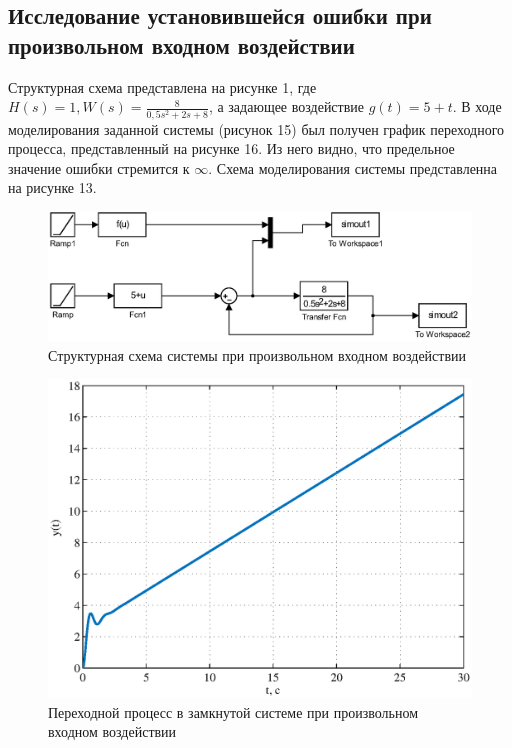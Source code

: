 \documentclass[a4paper,12pt]{article} %
\begin{document}
\newpage
\begin{center}
\section{Исследование установившейся ошибки при произвольном входном воздействии}
\end{center}\par
 Структурная схема представлена на рисунке 1, где $H(s) = 1, W(s) = \displaystyle{\frac{8}{0,5s^2 + 2s + 8}}$, а задающее воздействие $g(t) = {5 + t}$.
 В ходе моделирования заданной системы (рисунок 15) был получен график переходного процесса, представленный на рисунке 16. Из него видно, что предельное значение ошибки стремится к $\infty$. Схема моделирования системы представленна на рисунке 13.
\begin{figure}[H]
    \centering
    \includegraphics[width=1\linewidth]{scheme/scheme5.eps}
    \caption{Структурная схема системы при произвольном входном воздействии}
\end{figure}
\begin{figure}[H]
    \centering
    \includegraphics[width=1\linewidth]{scheme/plot13y.eps}
    \caption{Переходной процесс в замкнутой системе при произвольном входном воздействии}
\end{figure}
\end{document}
